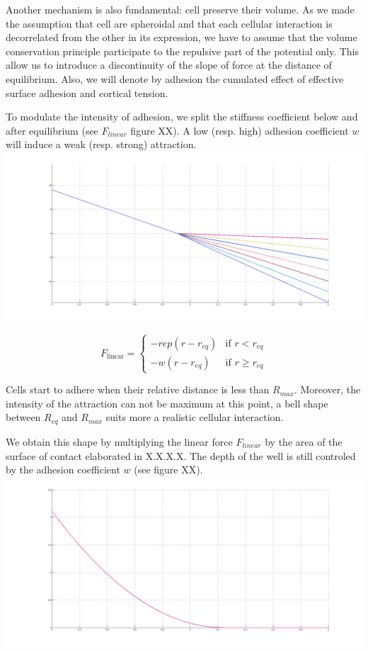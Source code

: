 Another mechanism is also fundamental: cell preserve their volume. As we made the assumption that cell are spheroidal and that each cellular interaction is decorrelated from the other in its expression, we have to assume that the volume conservation principle participate to the repulsive part of the potential only. This allow us to introduce a discontinuity of the slope of force at the distance of equilibrium. Also, we will denote by adhesion the cumulated effect of effective surface adhesion and cortical tension.

To modulate the intensity of adhesion, we split the stiffness coefficient below and after equilibrium (see $F_{linear}$ figure XX). A low (resp. high) adhesion coefficient $w$ will induce a weak (resp. strong) attraction.
\includegraphics{../../images/MECAGEN/potential/potential_linear_force.png}

$$F_{\text{linear}} = \begin{cases} - rep (r-r_{eq})  & \text{if }r< r_{eq} \\ - w (r-r_{eq}) & \text{if }r\geq r_{eq}  \end{cases}$$

Cells start to adhere when their relative distance is less than $R_{max}$. Moreover, the intensity of the attraction can not be maximum at this point, a bell shape between $R_{eq}$ and $R_{max}$ suits more a realistic cellular interaction.

We obtain this shape by multiplying the linear force $F_{linear}$ by the area of the surface of contact elaborated in X.X.X.X. The depth of the well is still controled by the adhesion coefficient $w$ (see figure XX).
\includegraphics{../../images/MECAGEN/potential/potential_surface.png}

